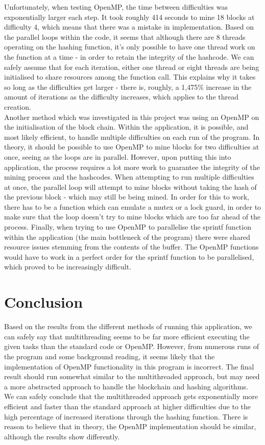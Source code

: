 \documentclass[12pt, a4paper]{article}
\begin{document}
Unfortunately, when testing OpenMP, the time between difficulties was exponentially larger each step. It took roughly 414 seconds to mine 18 blocks at difficulty 4, which means that there was a mistake in implementation. Based on the parallel loops within the code, it seems that although there are 8 threads operating on the hashing function, it's only possible to have one thread work on the function at a time - in order to retain the integrity of the hashcode. We can safely assume that for each iteration, either one thread or eight threads are being initialised to share resources among the function call. This explains why it takes so long as the difficulties get larger - there is, roughly, a 1,475\% increase in the amount of iterations as the difficulty increases, which applies to the thread creation. \\
Another method which was investigated in this project was using an OpenMP on the initialisation of the block chain. Within the application, it is possible, and most likely efficient, to handle multiple difficulties on each run of the program. In theory, it should be possible to use OpenMP to mine blocks for two difficulties at once, seeing as the loops are in parallel. However, upon putting this into application, the process requires a lot more work to guarantee the integrity of the mining process and the hashcodes. When attempting to run multiple difficulties at once, the parallel loop will attempt to mine blocks without taking the hash of the previous block - which may still be being mined. In order for this to work, there has to be a function which can emulate a mutex or a lock guard, in order to make sure that the loop doesn't try to mine blocks which are too far ahead of the process. Finally, when trying to use OpenMP to parallelise the sprintf function within the application (the main bottleneck of the program) there were shared resource issues stemming from the contents of the buffer. The OpenMP functions would have to work in a perfect order for the sprintf function to be parallelised, which proved to be increasingly difficult.

\section{Conclusion}
Based on the results from the different methods of running this application, we can safely say that multithreading seems to be far more efficient executing the given tasks than the standard code or OpenMP. However, from numerous runs of the program and some background reading, it seems likely that the implementation of OpenMP functionality in this program is incorrect. The final result should run somewhat similar to the multithreaded approach, but may need a more abstracted approach to handle the blockchain and hashing algorithms. \\
We can safely conclude that the multithreaded approach gets exponentially more efficient and faster than the standard approach at higher difficulties due to the high percentage of increased iterations through the hashing function. There is reason to believe that in theory, the OpenMP implementation should be similar, although the results show differently.

\newpage


{}
\nocite{*}
\end{document}

